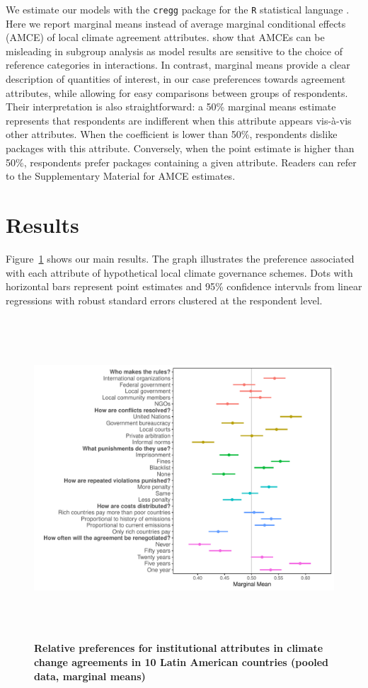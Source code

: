 \documentclass[a4paper,12pt]{article}
\begin{document}
We estimate our models with the \texttt{cregg} package \citep{leeper2018cregg} for the \texttt{R} statistical language \citep{rstats2019}. Here we report marginal means instead of average marginal conditional effects (AMCE) of local climate agreement attributes. \citet{leeper2018subgroup} show that AMCEs can be misleading in subgroup analysis as model results are sensitive to the choice of reference categories in interactions. In contrast, marginal means provide a clear description of quantities of interest, in our case preferences towards agreement attributes, while allowing for easy comparisons between groups of respondents. Their interpretation is also straightforward: a 50\% marginal means estimate represents that respondents are indifferent when this attribute appears vis-\`{a}-vis other attributes. When the coefficient is lower than 50\%, respondents dislike packages with this attribute. Conversely, when the point estimate is higher than 50\%, respondents prefer packages containing a given attribute. Readers can refer to the Supplementary Material for AMCE estimates.

\section{Results}%
\label{sec:results}

Figure~\ref{fig:pooled} shows our main results. The graph illustrates the preference associated with each attribute of hypothetical local climate governance schemes. Dots with horizontal bars represent point estimates and 95\% confidence intervals from linear regressions with robust standard errors clustered at the respondent level. 

\begin{figure}[ht]
	\centering
	\includegraphics[height=12cm]{MM_all.pdf}
	\caption{\textbf{Relative preferences for institutional attributes in climate change agreements in 10 Latin American countries (pooled data, marginal means)}}
	\label{fig:pooled}
\end{figure}
\end{document}
